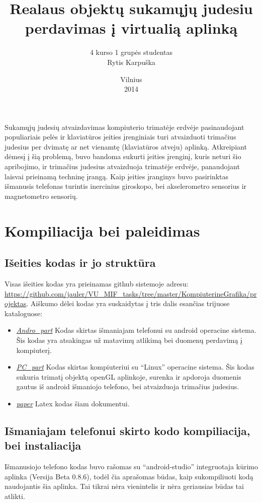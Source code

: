 \documentclass[12pt, a4paper, lithuanian, final]{article}
\title{Realaus objektų sukamųjų judesiu perdavimas į virtualią aplinką}
\author{
    4 kurso 1 grupės studentas \\
    Rytis Karpuška
}
\date{Vilnius \\
	2014}
\begin{document}
\maketitle


Sukamųjų judesių atvaizdavimas kompiuterio trimatėje erdvėje pasinaudojant populiariais pelės ir klaviatūros įeities įrenginiais turi atvaizduoti trimačius judesius per dvimatę ar net vienamtę (klaviatūros atveju) aplinką.
Atkreipiant dėmesį į šią problemą, buvo bandoma sukurti įeities įrenginį, kuris neturi šio apribojimo, ir trimačius judesius atvaizduoja trimatėje erdvėje, panaudojant laisvai prieinamą techninę įrangą.
Kaip įeities įranginys buvo pasirinktas išmanusis telefonas turintis inercinius giroskopo, bei akselerometro sensorius ir magnetometro sensorių.



\section{Kompiliacija bei paleidimas}

\subsection{Išeities kodas ir jo struktūra}
Visas išeities kodas yra prieinamas github sistemoje adresu: \url{https://github.com/jauler/VU_MIF_tasks/tree/master/KompiuterineGrafika/projektas}.
Aiškumo dėlei kodas yra suskaidytas į tris dalis esančias trijuose kataloguose:
\begin{itemize}
	\item \textit{\url{Andro_part}} Kodas skirtas išmaniajam telefonui su android operacine sistema.
		Šis kodas yra atsakingas už matavimų atlikimą bei duomenų perdavimą į kompiuterį.
	\item \textit{\url{PC_part}} Kodas skirtas kompiuteriui su "`Linux"' operacine sistema.
		Šis kodas sukuria trimatį objektą openGL aplinkoje, surenka ir apdoroja duomenis gautus iš android išmaniojo telefono, bei atvaizduoja trimačius judesius.
	\item \textit{\url{paper}} Latex kodas šiam dokumentui.
\end{itemize}

\subsection{Išmaniajam telefonui skirto kodo kompiliacija, bei instaliacija}
Išmanusiojo telefono kodas buvo rašomas su "`android-studio"' integruotaja kūrimo aplinka (Versija Beta 0.8.6), todėl čia aprašomas būdas, kaip sukompiliuoti kodą naudojantis šia aplinka.
Tai tikrai nėra vienintelis ir nėra geriausias būdas tai atlikti.
\end{document}
